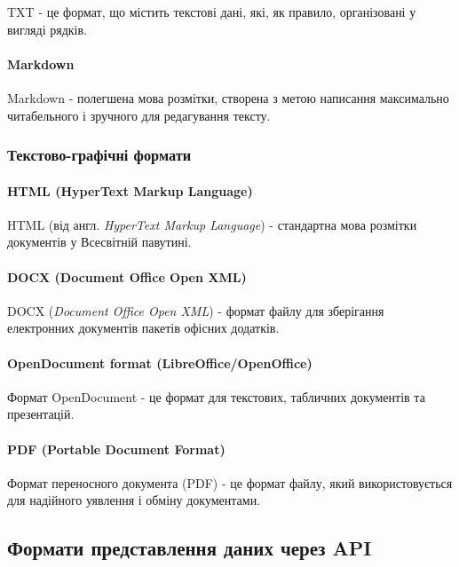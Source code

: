 TXT - це формат, що містить текстові дані, які, як правило, організовані у вигляді рядків.

\paragraph{Markdown}

Markdown - полегшена мова розмітки, створена з метою написання максимально читабельного і зручного для редагування тексту.

\subsubsection{Текстово-графічні формати}

\paragraph{HTML (HyperText Markup Language)}

HTML (від англ. \textit{HyperText Markup Language}) - стандартна мова розмітки документів у Всесвітній павутині.

\paragraph{DOCX (Document Office Open XML)}

DOCX (\textit{Document Office Open XML}) - формат файлу для зберігання електронних документів пакетів офісних додатків.

\paragraph{OpenDocument format (LibreOffice/OpenOffice)}

Формат OpenDocument - це формат для текстових, табличних документів та презентацій.

\paragraph{PDF (Portable Document Format)}

Формат переносного документа (PDF) - це формат файлу, який використовується для надійного уявлення і обміну документами.

\subsection{Формати представлення даних через API}

